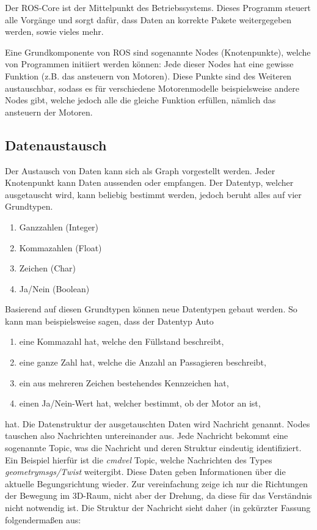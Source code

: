 {{	Der ROS-Core ist der Mittelpunkt des Betriebssystems. Dieses Programm steuert alle Vorgänge und sorgt dafür, dass Daten an korrekte Pakete weitergegeben werden, sowie vieles mehr. 
	
	Eine Grundkomponente von ROS sind sogenannte Nodes (Knotenpunkte), welche von Programmen initiiert werden können: Jede dieser Nodes hat eine gewisse Funktion (z.B. das ansteuern von Motoren). Diese Punkte sind des Weiteren austauschbar, sodass es für verschiedene Motorenmodelle beispielsweise andere Nodes gibt, welche jedoch alle die gleiche Funktion erfüllen, nämlich das ansteuern der Motoren.
	}

	\subsection{Datenaustausch}
	{
		Der Austausch von Daten kann sich als Graph vorgestellt werden. Jeder Knotenpunkt kann Daten aussenden oder empfangen. Der Datentyp, welcher ausgetauscht wird, kann beliebig bestimmt werden, jedoch beruht alles auf vier Grundtypen.
		\begin{enumerate}
			\item Ganzzahlen (Integer)
			\item Kommazahlen (Float)
			\item Zeichen (Char)
			\item Ja/Nein (Boolean)
		\end{enumerate}
		Basierend auf diesen Grundtypen können neue Datentypen gebaut werden. So kann man beispielsweise sagen, dass der Datentyp Auto
		\begin{enumerate}
			\item eine Kommazahl hat, welche den Füllstand beschreibt,
			\item eine ganze Zahl hat, welche die Anzahl an Passagieren beschreibt,
			\item ein aus mehreren Zeichen bestehendes Kennzeichen hat,
			\item einen Ja/Nein-Wert hat, welcher bestimmt, ob der Motor an ist,
		\end{enumerate}
		
		hat. Die Datenstruktur der ausgetauschten Daten wird Nachricht genannt. Nodes tauschen also Nachrichten untereinander aus. Jede Nachricht bekommt eine sogenannte Topic, was die Nachricht und deren Struktur eindeutig identifiziert. Ein Beispiel hierfür ist die \textit{cmd\textunderscore vel} Topic, welche Nachrichten des Types \textit{geometry\textunderscore msgs/Twist} weitergibt. Diese Daten geben Informationen über die aktuelle Begungsrichtung wieder. Zur vereinfachung zeige ich nur die Richtungen der Bewegung im 3D-Raum, nicht aber der Drehung, da diese für das Verständnis nicht notwendig ist. Die Struktur der Nachricht sieht daher (in gekürzter Fassung folgendermaßen aus:
		\newline
		
}}
